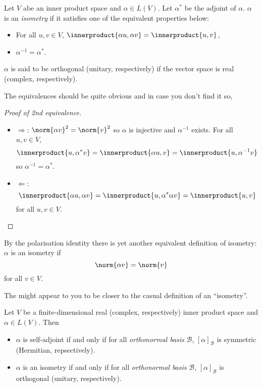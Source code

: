 \documentclass[a4paper]{article}
\newcommand*{\basis}{\mathcal}
\newcommand*{\ip}{\innerproduct}
\theoremstyle{definition}
\begin{document}
\begin{definition}[Isometry]
  Let \(V\) abe an inner product space and \(\alpha \in L(V)\). Let \(\alpha^*\) be the adjoint of \(\alpha\). \(\alpha\) is an \emph{isometry} if it satisfies one of the equivalent properties below:
  \begin{itemize}
  \item For all \(u, v \in V\), \(\ip{\alpha u, \alpha v} = \ip{u, v}\),
  \item \(\alpha^{-1} = \alpha^*\).
  \end{itemize}

  \(\alpha\) is said to be orthogonal (unitary, respectively) if the vector space is real (complex, respectively).
\end{definition}

The equivalences should be quite obvious and in case you don't find it so,

\begin{proof}[Proof of 2nd equivalence]\leavevmode
  \begin{itemize}
  \item \(\Rightarrow\): \(\norm{\alpha v}^2 = \norm{v}^2\) so \(\alpha\) is injective and \(\alpha^{-1}\) exists. For all \(u, v \in V\),
    \[
      \ip{u, \alpha^*v} = \ip{\alpha u, v} = \ip{u, \alpha^{-1}v}
    \]
    so \(\alpha^{-1} = \alpha^*\).
  \item \(\Leftarrow\):
    \[
      \ip{\alpha u, \alpha v} = \ip{u, \alpha^*\alpha v} = \ip{u, v}
    \]
    for all \(u, v \in V\).
  \end{itemize}
\end{proof}

\begin{remark}
  By the polarisation identity there is yet another equivalent definition of isometry: \(\alpha\) is an isometry if
  \[
    \norm{\alpha v} = \norm{v}
  \]
  for all \(v \in V\).
\end{remark}

The might appear to you to be closer to the casual definition of an ``isometry''.

\begin{lemma}
  Let \(V\) be a finite-dimensional real (complex, respectively) inner product space and \(\alpha \in L(V)\). Then
  \begin{itemize}
  \item \(\alpha\) is self-adjoint if and only if for all \emph{orthonormal basis} \(\basis B\), \([\alpha]_{\basis B}\) is symmetric (Hermitian, repsectively).
  \item \(\alpha\) is an isometry if and only if for all \emph{orthonormal basis} \(\basis B\), \([\alpha]_{\basis B}\) is orthogonal (unitary, respectively).
  \end{itemize}
\end{lemma}
\end{document}
